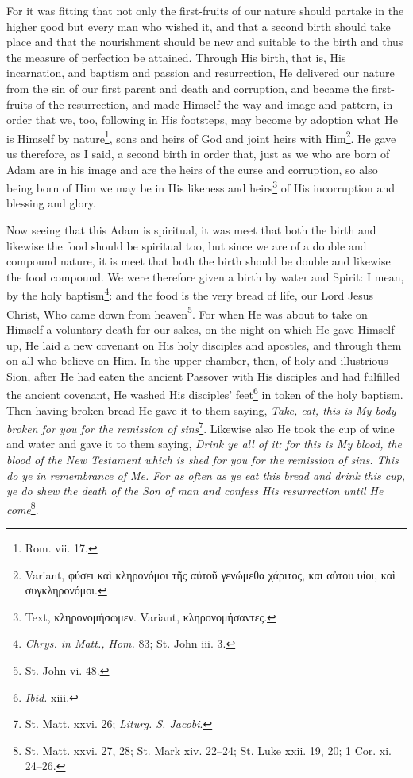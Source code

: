 For it was fitting that not only the first-fruits of our nature should partake in the higher good but every man who wished it, and that a second birth should take place and that the nourishment should be new and suitable to the birth and thus the measure of perfection be attained. Through His birth, that is, His incarnation, and baptism and passion and resurrection, He delivered our nature from the sin of our first parent and death and corruption, and became the first-fruits of the resurrection, and made Himself the way and image and pattern, in order that we, too, following in His footsteps, may become by adoption what He is Himself by nature\footnote{Rom. vii. 17.}, sons and heirs of God and joint heirs with Him\footnote{Variant, \textgreek{φύσει καὶ κληρονόμοι τῆς αὐτοῦ γενώμεθα χάριτος, και αὐτου υἰοι, καὶ συγκληρονόμοι}.}. He gave us therefore, as I said, a second birth in order that, just as we who are born of Adam are in his image and are the heirs of the curse and corruption, so also being born of Him we may be in His likeness and heirs\footnote{Text, \textgreek{κληρονομήσωμεν}. Variant, \textgreek{κληρονομήσαντες}.} of His incorruption and blessing and glory.

Now seeing that this Adam is spiritual, it was meet that both the birth and likewise the food should be spiritual too, but since we are of a double and compound nature, it is meet that both the birth should be double and likewise the food compound. We were therefore given a birth by water and Spirit: I mean, by the holy baptism\footnote{\emph{Chrys. in Matt., Hom. }83; St. John iii. 3.}: and the food is the very bread of life, our Lord Jesus Christ, Who came down from heaven\footnote{St. John vi. 48.}. For when He was about to take on Himself a voluntary death for our sakes, on the night on which He gave Himself up, He laid a new covenant on His holy disciples and apostles, and through them on all who believe on Him. In the upper chamber, then, of holy and illustrious Sion, after He had eaten the ancient Passover with His disciples and had fulfilled the ancient covenant, He washed His disciples’ feet\footnote{\emph{Ibid.} xiii.} in token of the holy baptism. Then having broken bread He gave it to them saying, \emph{Take, eat, this is My body broken for you for the remission of sins}\footnote{St. Matt. xxvi. 26; \emph{Liturg. S. Jacobi}.}. Likewise also He took the cup of wine and water and gave it to them saying, \emph{Drink ye all of it: for this is My blood, the blood of the New Testament which is shed for you for the remission of sins. This do ye in remembrance of Me. For as often as ye eat this bread and drink this cup, ye do shew the death of the Son of man and confess His resurrection until He come}\footnote{St. Matt. xxvi. 27, 28; St. Mark xiv. 22–24; St. Luke xxii. 19, 20; 1 Cor. xi. 24–26.}.

